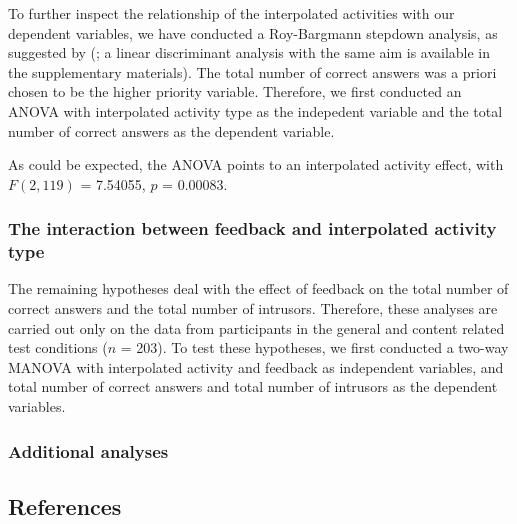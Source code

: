 \documentclass[11pt,]{article}
\begin{document}
To further inspect the relationship of the interpolated activities with
our dependent variables, we have conducted a Roy-Bargmann stepdown
analysis, as suggested by \citeauthor{tabachnick_using_2012}
(\citeyear{tabachnick_using_2012}; a linear discriminant analysis with
the same aim is available in the supplementary materials). The total
number of correct answers was a priori chosen to be the higher priority
variable. Therefore, we first conducted an ANOVA with interpolated
activity type as the indepedent variable and the total number of correct
answers as the dependent variable.

As could be expected, the ANOVA points to an interpolated activity
effect, with \(F(2, 119)\) = 7.54055, \(p\) = 0.00083.

\hypertarget{the-interaction-between-feedback-and-interpolated-activity-type}{%
\subsubsection{The interaction between feedback and interpolated
activity
type}\label{the-interaction-between-feedback-and-interpolated-activity-type}}

The remaining hypotheses deal with the effect of feedback on the total
number of correct answers and the total number of intrusors. Therefore,
these analyses are carried out only on the data from participants in the
general and content related test conditions (\(n\) = 203). To test these
hypotheses, we first conducted a two-way MANOVA with interpolated
activity and feedback as independent variables, and total number of
correct answers and total number of intrusors as the dependent
variables.

\hypertarget{additional-analyses}{%
\subsubsection{Additional analyses}\label{additional-analyses}}

\onecolumn

\hypertarget{references}{%
\subsection{References}\label{references}}



\end{document}
